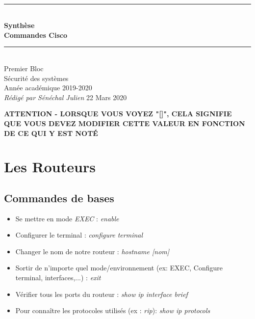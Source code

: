 \documentclass[a4paper]{article}
\newcommand{\HRule}{\rule{\linewidth}{0.5mm}}
\begin{document}
  \begin{titlepage}
    \begin{sffamily}
      \begin{center}
        \textnormal{}\\[6.5cm]
        \HRule \\[0.4cm]
        { \Huge \bfseries Synthèse\\ Commandes Cisco\\ [0.4cm] }
        \HRule \\[3cm]
        \Large
        Premier Bloc\\
        Sécurité des systèmes\\
        Année académique 2019-2020\\[0.5cm]
        \emph{Rédigé par Sénéchal Julien}
        \vfill
        {\large 22 Mars 2020}
      \end{center}
    \end{sffamily}
  \end{titlepage}

\Large\textbf{ATTENTION - LORSQUE VOUS VOYEZ "[]", CELA SIGNIFIE QUE VOUS DEVEZ MODIFIER CETTE VALEUR EN FONCTION DE CE QUI Y EST NOTÉ}
\normalsize
\section{Les Routeurs}

\subsection{Commandes de bases}
\begin{itemize}
  \item Se mettre en mode \emph{EXEC} : \emph{enable}
  \item Configurer le terminal : \emph{configure terminal}
  \item Changer le nom de notre routeur : \emph{hostname [nom]}
  \item Sortir de n'importe quel mode/environnement (ex: EXEC, Configure terminal, interfaces,...) : \emph{exit}
  \item Vérifier tous les ports du routeur : \emph{show ip interface brief}
  \item Pour connaître les protocoles utilisés (ex : \emph{rip}): \emph{show ip protocols}
\end{itemize}
\end{document}
